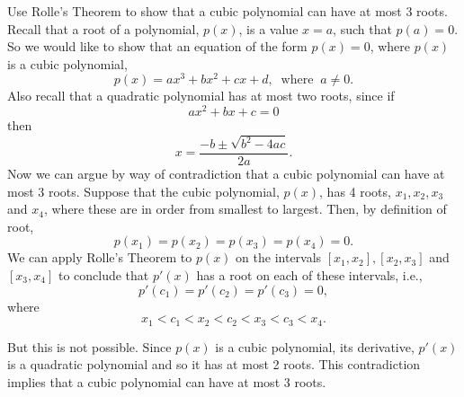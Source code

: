 \documentclass{ximera}
\begin{document}
\begin{example} Use Rolle's Theorem  to show that a cubic polynomial can have at most 3 roots.\\
Recall that a root of a polynomial, $p(x)$, is a value $x = a$, such that $p(a) = 0$.
So we would like to show that an equation of the form $p(x) = 0$, where $p(x)$ is a cubic polynomial, 
\[
p(x) = ax^3 + bx^2 + cx + d, \;\; \text{where} \;\; a\neq 0.
\]
Also recall that a quadratic polynomial has at most two roots, since if
\[
ax^2 + bx + c = 0
\]
then
\[
x = \frac{-b \pm \sqrt{b^2 - 4ac}}{2a}.
\]
Now we can argue by way of contradiction that a cubic polynomial can have at most 3 roots.
Suppose that the cubic polynomial, $p(x)$, has 4 roots, $x_1, x_2, x_3$ and $x_4$, where these are in order from smallest to largest.
Then, by definition of root,
\[
p(x_1) = p(x_2) = p(x_3) = p(x_4) = 0.
\]
We can apply Rolle's Theorem to $p(x)$ on the intervals $[x_1, x_2], [x_2, x_3]$ and $[x_3, x_4]$ to conclude
that $p'(x)$ has a root on each of these intervals, i.e.,
\[
p'(c_1) = p'(c_2) = p'(c_3) = 0,
\]
where
\[
x_1 < c_1 < x_2 < c_2 < x_3 < c_3 < x_4.
\]
\begin{image}
\end{image}

But this is not possible. Since $p(x)$ is a cubic polynomial, its derivative, $p'(x)$ is a quadratic polynomial and so it has at most 2 roots.
This contradiction implies that a cubic polynomial can have at most 3 roots.
\end{example}
\end{document}

